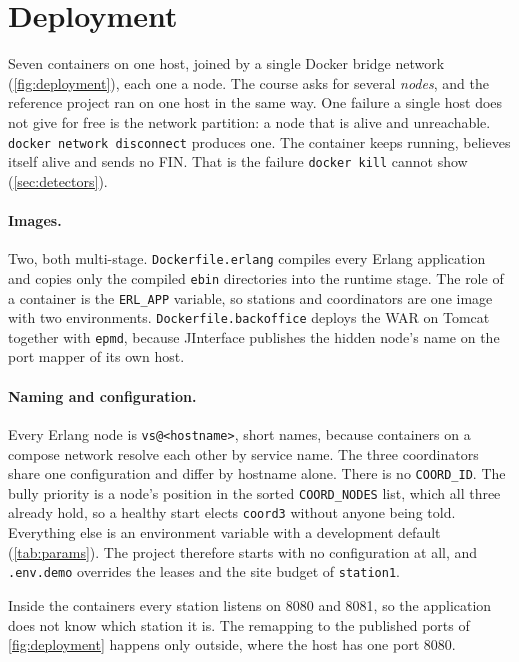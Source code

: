 \section{Deployment}
\label{sec:deployment}

Seven containers on one host, joined by a single Docker bridge network
(\cref{fig:deployment}), each one a node. The course asks for several \emph{nodes},
and the reference project ran on one host in the same way. One failure a single host does
not give for free is the network partition: a node that is alive and unreachable.
\texttt{docker network disconnect} produces one. The container keeps running, believes
itself alive and sends no FIN. That is the failure \texttt{docker kill} cannot show
(\cref{sec:detectors}).

\paragraph{Images.} Two, both multi-stage. \texttt{Dockerfile.erlang} compiles every Erlang
application and copies only the compiled \texttt{ebin} directories into the runtime stage.
The role of a container is the \texttt{ERL\_APP} variable, so stations and coordinators are
one image with two environments. \texttt{Dockerfile.backoffice} deploys the WAR on Tomcat
together with \texttt{epmd}, because JInterface publishes the hidden node's name on the port
mapper of its own host.

\paragraph{Naming and configuration.} Every Erlang node is \texttt{vs@<hostname>}, short
names, because containers on a compose network resolve each other by service name. The three
coordinators share one configuration and differ by hostname alone. There is no
\texttt{COORD\_ID}. The bully priority is a node's position in the sorted
\texttt{COORD\_NODES} list, which all three already hold, so a healthy start elects
\texttt{coord3} without anyone being told. Everything else is an environment variable with a
development default (\cref{tab:params}). The project therefore starts with no configuration
at all, and \texttt{.env.demo} overrides the leases and the site budget of
\texttt{station1}.

Inside the containers every station listens on 8080 and 8081, so the application does not
know which station it is. The remapping to the published ports of \cref{fig:deployment}
happens only outside, where the host has one port 8080.

